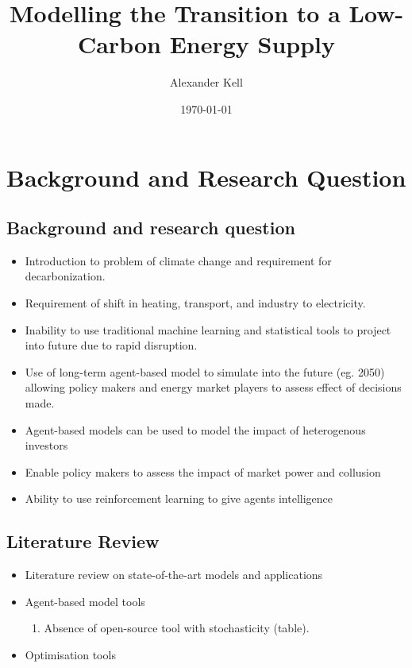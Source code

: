 \documentclass[12pt]{article}
\title{Modelling the Transition to a Low-Carbon Energy Supply}
\author{Alexander Kell}
\date{\today}
\begin{document}
\maketitle

\clearpage

\section{Background and Research Question}

\subsection{Background and research question}
\begin{itemize}
  \item Introduction to problem of climate change and requirement for decarbonization.
  \item Requirement of shift in heating, transport, and industry to electricity.
  \item Inability to use traditional machine learning and statistical tools to project into future due to rapid disruption.
  \item Use of long-term agent-based model to simulate into the future (eg. 2050) allowing policy makers and energy market players to assess effect of decisions made.
  \item Agent-based models can be used to model the impact of heterogenous investors
  \item Enable policy makers to assess the impact of market power and collusion
  \item Ability to use reinforcement learning to give agents intelligence
\end{itemize}

\subsection{Literature Review}

\begin{itemize}
  \item  Literature review on state-of-the-art models and applications
  \item Agent-based model tools
  \begin{enumerate}
  	\item Absence of open-source tool with stochasticity (table).
  \end{enumerate}

  \item Optimisation tools
\end{itemize}
\end{document}
